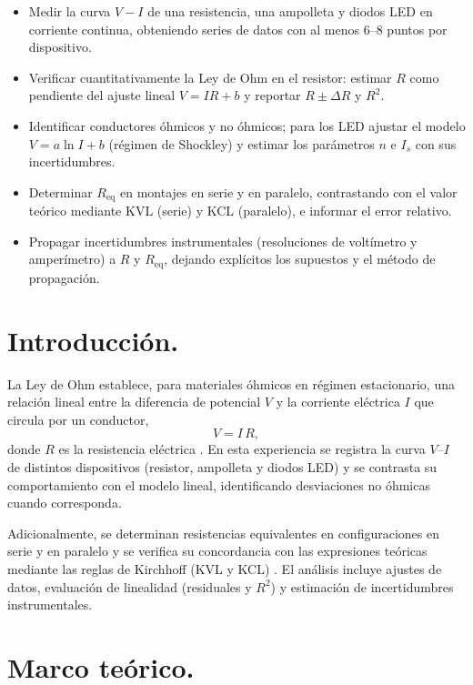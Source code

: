 \documentclass[11pt,twocolumn]{article}
\makeatletter
\let\orig@cite\cite
\renewcommand{\cite}[1]{\textcolor{Blue}{\orig@cite{#1}}}
\let\orig@parencite\parencite
\renewcommand{\parencite}[1]{\textcolor{Blue}{\orig@parencite{#1}}}
\renewcommand{\cite}[1]{\parencite{#1}}      %
\let\orig@cite\cite
\renewcommand{\cite}[1]{\textcolor{Blue}{\orig@cite{#1}}} %
\makeatother
\begin{document}
\begin{itemize}[leftmargin=*,itemsep=2pt,topsep=2pt]
    \item Medir la curva $V\!-\!I$ de una resistencia, una ampolleta y diodos LED en corriente continua, obteniendo series de datos con al menos 6--8 puntos por dispositivo.
    \item Verificar cuantitativamente la Ley de Ohm en el resistor: estimar $R$ como pendiente del ajuste lineal $V=IR+b$ y reportar $R\pm\Delta R$ y $R^2$.
    \item Identificar conductores óhmicos y no óhmicos; para los LED ajustar el modelo $V=a\ln I+b$ (régimen de Shockley) y estimar los parámetros $n$ e $I_s$ con sus incertidumbres.
    \item Determinar $R_{\mathrm{eq}}$ en montajes en serie y en paralelo, contrastando con el valor teórico mediante KVL (serie) y KCL (paralelo), e informar el error relativo.
    \item Propagar incertidumbres instrumentales (resoluciones de voltímetro y amperímetro) a $R$ y $R_{\mathrm{eq}}$, dejando explícitos los supuestos y el método de propagación.
\end{itemize}

\section{Introducción.}

La Ley de Ohm establece, para materiales óhmicos en régimen estacionario, una relación lineal entre la diferencia de potencial $V$ y la corriente eléctrica $I$ que circula por un conductor, 
\begin{equation*}
    V = I\,R,
\end{equation*}
donde $R$ es la resistencia eléctrica \cite{openstax-ohms}. En esta experiencia se registra la curva $V$--$I$ de distintos dispositivos (resistor, ampolleta y diodos LED) y se contrasta su comportamiento con el modelo lineal, identificando desviaciones no óhmicas cuando corresponda. 

Adicionalmente, se determinan resistencias equivalentes en configuraciones en serie y en paralelo y se verifica su concordancia con las expresiones teóricas mediante las reglas de Kirchhoff (KVL y KCL) \cite{openstax-series-parallel,openstax-kirchhoff}. El análisis incluye ajustes de datos, evaluación de linealidad (residuales y $R^2$) y estimación de incertidumbres instrumentales.

\section{Marco teórico.}
\end{document}
